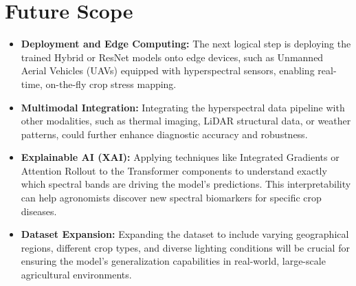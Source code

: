 \documentclass[ 12pt,a4paper,twocolumn,fleqn]{report}
\begin{document}
\section{Future Scope}
\vspace{4mm}
\begin{itemize}
    \item \textbf{Deployment and Edge Computing:} The next logical step is deploying the trained Hybrid or ResNet models onto edge devices, such as Unmanned Aerial Vehicles (UAVs) equipped with hyperspectral sensors, enabling real-time, on-the-fly crop stress mapping.
    \item \textbf{Multimodal Integration:} Integrating the hyperspectral data pipeline with other modalities, such as thermal imaging, LiDAR structural data, or weather patterns, could further enhance diagnostic accuracy and robustness.
    \item \textbf{Explainable AI (XAI):} Applying techniques like Integrated Gradients or Attention Rollout to the Transformer components to understand exactly which spectral bands are driving the model's predictions. This interpretability can help agronomists discover new spectral biomarkers for specific crop diseases.
    \item \textbf{Dataset Expansion:} Expanding the dataset to include varying geographical regions, different crop types, and diverse lighting conditions will be crucial for ensuring the model's generalization capabilities in real-world, large-scale agricultural environments.
\end{itemize}
\end{document}
